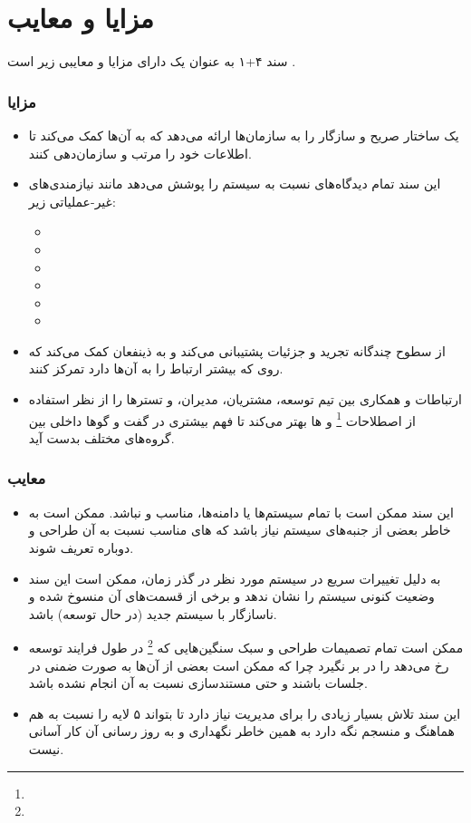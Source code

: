 \documentclass[a4paper]{article}
\begin{document}
\section*{مزایا و معایب}

سند ۴+۱ به عنوان یک  دارای مزایا و معایبی زیر است \cite{linkedin}.

\subsubsection*{مزایا}

\begin{itemize}
    \item یک ساختار صریح و سازگار را به سازمان‌ها ارائه می‌دهد که به آن‌ها کمک
    می‌کند تا اطلاعات خود را مرتب و سازمان‌دهی کنند.
    \item این سند تمام دیدگاه‌های نسبت به سیستم را پوشش می‌دهد مانند
    نیازمندی‌های غیر-عملیاتی زیر:
    \begin{itemize}
        \item {}
        \item {}
        \item {}
        \item {}
        \item {}
        \item {}
    \end{itemize}
    \item از سطوح چندگانه تجرید و جزئیات پشتیبانی می‌کند و به ذینفعان کمک می‌کند
    که روی  که بیشتر ارتباط را به آن‌ها دارد تمرکز کنند.
    \item ارتباطات و همکاری بین تیم توسعه، مشتریان، مدیران، و تستر‌ها را از نظر
    استفاده از اصطلاحات \footnote{} و ها بهتر
    می‌کند تا فهم بیشتری در گفت و گو‌ها داخلی بین گروه‌های مختلف بدست آید.
\end{itemize}

\subsubsection*{معایب}

\begin{itemize}
    \item این سند ممکن است با تمام سیستم‌ها یا دامنه‌ها، مناسب و  نباشد.
    ممکن است به خاطر بعضی از جنبه‌های سیستم نیاز باشد که های مناسب نسبت
    به آن طراحی و دوباره تعریف شوند.
    \item به دلیل تغییرات سریع در سیستم مورد نظر در گذر زمان، ممکن است این سند
    وضعیت کنونی سیستم را نشان ندهد و برخی از قسمت‌های آن منسوخ شده و ناسازگار با
    سیستم جدید (در حال توسعه) باشد.
    \item ممکن است تمام تصمیمات طراحی و سبک سنگین‌هایی که
    \footnote{} در طول فرایند توسعه رخ می‌دهد را در بر نگیرد چرا
    که ممکن است بعضی از آن‌ها به صورت ضمنی در جلسات باشند و حتی مستندسازی نسبت
    به آن انجام نشده باشد.
    \item این سند تلاش بسیار زیادی را برای مدیریت نیاز دارد تا بتواند ۵ لایه
     را نسبت به هم هماهنگ و منسجم نگه دارد به همین خاطر نگهداری و به
    روز رسانی آن کار آسانی نیست.
\end{itemize}
\end{document}
